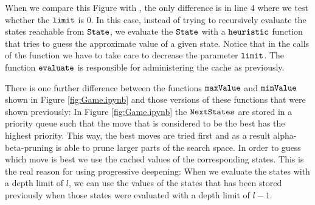 When we compare this Figure with , the only difference is in line 4
where we test whether the $\texttt{limit}$ is $0$.  In this case, instead of trying to recursively evaluate the
states reachable from $\texttt{State}$, we evaluate the $\texttt{State}$ with a $\texttt{heuristic}$ function
that tries to guess the approximate value of a given state.
Notice that in the calls of the function  we have to take care to decrease the parameter
$\texttt{limit}$.  The function $\texttt{evaluate}$ is responsible for administering the cache as previously.

There is one further difference between the functions $\texttt{maxValue}$ and $\texttt{minValue}$ shown in
Figure \ref{fig:Game.ipynb} and those versions of these functions that were shown previously:
In Figure \ref{fig:Game.ipynb} the $\texttt{NextStates}$ are stored in a priority queue such that the move that
is considered to be the best has the highest priority.  This way, the best moves are tried first and as a
result alpha-beta-pruning is able to prune larger parts of the search space.
In order to guess which move is best we use the cached values of the corresponding states.  This is the real
reason for using progressive deepening:  When we evaluate the states with a depth limit of $l$, we can use the
values of the states that has been stored previously when those states were evaluated with a depth limit of
$l-1$. 

